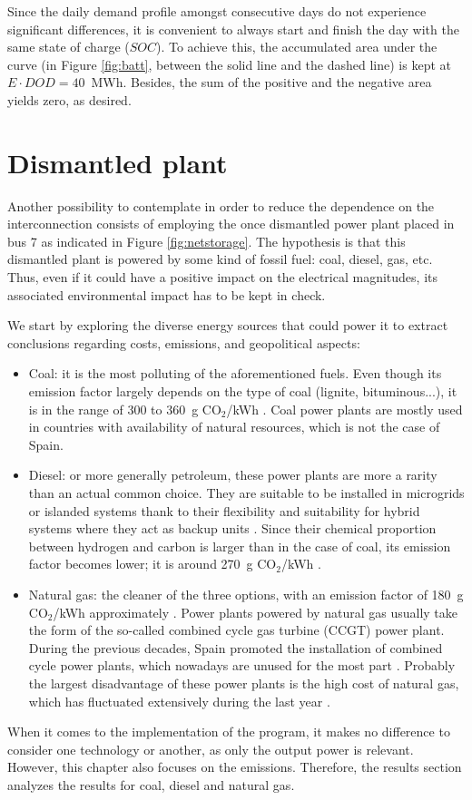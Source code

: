 Since the daily demand profile amongst consecutive days do not experience significant differences, it is convenient to always start and finish the day with the same state of charge ($SOC$). To achieve this, the accumulated area under the curve (in Figure \ref{fig:batt}, between the solid line and the dashed line) is kept at $E \cdot DOD=40$~MWh. Besides, the sum of the positive and the negative area yields zero, as desired. 


\section{Dismantled plant}
Another possibility to contemplate in order to reduce the dependence on the interconnection consists of employing the once dismantled power plant placed in bus 7 as indicated in Figure \ref{fig:netstorage}. The hypothesis is that this dismantled plant is powered by some kind of fossil fuel: coal, diesel, gas, etc. Thus, even if it could have a positive impact on the electrical magnitudes, its associated environmental impact has to be kept in check. 

We start by exploring the diverse energy sources that could power it to extract conclusions regarding costs, emissions, and geopolitical aspects:
\begin{itemize}
  \item Coal: it is the most polluting of the aforementioned fuels. Even though its emission factor largely depends on the type of coal (lignite, bituminous...), it is in the range of 300 to 360~g CO$_2$/kWh \cite{gencat}. Coal power plants are mostly used in countries with availability of natural resources, which is not the case of Spain.
  \item Diesel: or more generally petroleum, these power plants are more a rarity than an actual common choice. They are suitable to be installed in microgrids or islanded systems thank to their flexibility and suitability for hybrid systems where they act as backup units \cite{ismail2013techno}. Since their chemical proportion between hydrogen and carbon is larger than in the case of coal, its emission factor becomes lower; it is around 270~g CO$_2$/kWh \cite{gencat}. 
  \item Natural gas: the cleaner of the three options, with an emission factor of 180~g CO$_2$/kWh approximately \cite{gencat}. Power plants powered by natural gas usually take the form of the so-called combined cycle gas turbine (CCGT) power plant. During the previous decades, Spain promoted the installation of combined cycle power plants, which nowadays are unused for the most part \cite{aleasoft}. Probably the largest disadvantage of these power plants is the high cost of natural gas, which has fluctuated extensively during the last year \cite{gascost}. 
\end{itemize}
When it comes to the implementation of the program, it makes no difference to consider one technology or another, as only the output power is relevant. However, this chapter also focuses on the emissions. Therefore, the results section analyzes the results for coal, diesel and natural gas.

